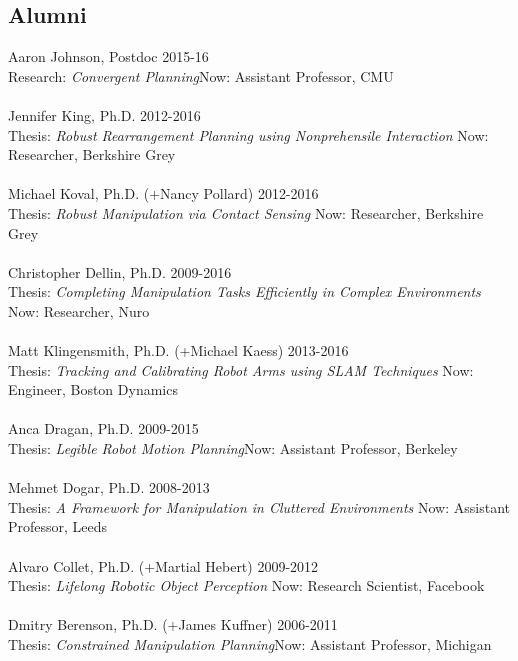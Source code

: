 \subsection{Alumni}
\noindent
Aaron Johnson, Postdoc \hfill 2015-16\\
Research: \textit{Convergent Planning}\hfill Now: Assistant Professor, CMU\\
\\
Jennifer King, Ph.D. \hfill 2012-2016\\
Thesis: \textit{Robust Rearrangement Planning using Nonprehensile Interaction} \hfill Now: Researcher, Berkshire Grey\\
\\
Michael Koval, Ph.D. (+Nancy Pollard) \hfill 2012-2016\\
Thesis: \textit{Robust Manipulation via Contact Sensing} \hfill Now: Researcher, Berkshire Grey\\
\\
Christopher Dellin, Ph.D. \hfill 2009-2016\\
Thesis: \textit{Completing Manipulation Tasks Efficiently in Complex Environments} \hfill Now: Researcher, Nuro\\
\\
Matt Klingensmith, Ph.D. (+Michael Kaess) \hfill 2013-2016\\
Thesis: \textit{Tracking and Calibrating Robot Arms using SLAM Techniques} \hfill Now: Engineer, Boston Dynamics\\
\\
Anca Dragan, Ph.D. \hfill 2009-2015\\
Thesis: \textit{Legible Robot Motion Planning}\hfill Now: Assistant Professor, Berkeley\\
\\
Mehmet Dogar, Ph.D. \hfill 2008-2013\\
Thesis: \textit{A Framework for Manipulation in Cluttered Environments} \hfill Now: Assistant Professor, Leeds\\
\\
Alvaro Collet, Ph.D. (+Martial Hebert) \hfill 2009-2012\\
Thesis: \textit{Lifelong Robotic Object Perception} \hfill Now: Research Scientist, Facebook\\
\\
Dmitry Berenson, Ph.D. (+James Kuffner) \hfill 2006-2011\\
Thesis: \textit{Constrained Manipulation Planning}\hfill Now: Assistant Professor, Michigan\\
